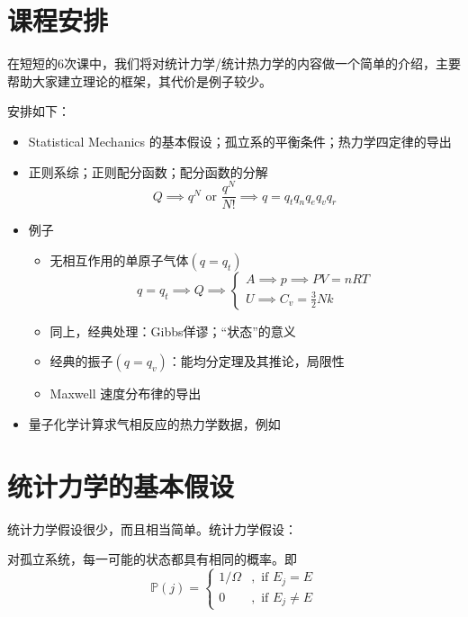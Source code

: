 \chapter*{课程安排}

在短短的6次课中，我们将对统计力学/统计热力学的内容做一个简单的介绍，主要帮助大家建立理论的框架，其代价是例子较少。

安排如下：
\begin{itemize}
    \item Statistical Mechanics 的基本假设；孤立系的平衡条件；热力学四定律的导出
    \item 正则系综；正则配分函数；配分函数的分解
          \begin{equation*}
              Q \implies q^N \text{ or } \frac{q^N}{N!} \implies q = q_t q_n q_e q_v q_r
          \end{equation*}
    \item 例子
          \begin{itemize}
              \item 无相互作用的单原子气体$(q=q_t)$
                    \begin{equation*}
                        q=q_t \implies Q \implies
                        \begin{cases}
                            A \implies p \implies PV=nRT \\
                            U \implies C_v = \frac{3}{2}Nk
                        \end{cases}
                    \end{equation*}
              \item 同上，经典处理：Gibbs佯谬；“状态”的意义
              \item 经典的振子$(q=q_v)$：能均分定理及其推论，局限性
              \item Maxwell 速度分布律的导出
          \end{itemize}
    \item 量子化学计算求气相反应的热力学数据，例如
\end{itemize}



\chapter{统计力学的基本假设}
统计力学假设很少，而且相当简单。统计力学假设：


\begin{postulate}
    对孤立系统，每一可能的状态都具有相同的概率。即
    \begin{equation}
        \mathbb{P}(j) = \left\{
        \begin{aligned}
            1/\Omega & , \text{ if } E_j = E    \\
            0        & , \text{ if } E_j \neq E
        \end{aligned}
        \right.
    \end{equation}
\end{postulate}

